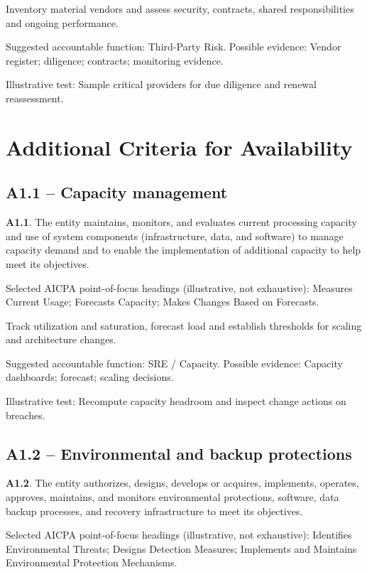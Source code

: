 \documentclass[10pt,oneside]{report}
\begin{document}
\begin{engineeringbox}
Inventory material vendors and assess security, contracts, shared responsibilities and ongoing performance.
\end{engineeringbox}
Suggested accountable function: Third-Party Risk. Possible evidence: Vendor register; diligence; contracts; monitoring evidence.

Illustrative test: Sample critical providers for due diligence and renewal reassessment.

\section{Additional Criteria for Availability}
\subsection*{A1.1 -- Capacity management}
\begin{aicpabox}
\textbf{A1.1}. The entity maintains, monitors, and evaluates current processing capacity and use of system components (infrastructure, data, and software) to manage capacity demand and to enable the implementation of additional capacity to help meet its objectives.\par{}
\end{aicpabox}
Selected AICPA point-of-focus headings (illustrative, not exhaustive): Measures Current Usage; Forecasts Capacity; Makes Changes Based on Forecasts.

\begin{engineeringbox}
Track utilization and saturation, forecast load and establish thresholds for scaling and architecture changes.
\end{engineeringbox}
Suggested accountable function: SRE / Capacity. Possible evidence: Capacity dashboards; forecast; scaling decisions.

Illustrative test: Recompute capacity headroom and inspect change actions on breaches.

\subsection*{A1.2 -- Environmental and backup protections}
\begin{aicpabox}
\textbf{A1.2}. The entity authorizes, designs, develops or acquires, implements, operates, approves, maintains, and monitors environmental protections, software, data backup processes, and recovery infrastructure to meet its objectives.\par{}
\end{aicpabox}
Selected AICPA point-of-focus headings (illustrative, not exhaustive): Identifies Environmental Threats; Designs Detection Measures; Implements and Maintains Environmental Protection Mechanisms.
\end{document}

